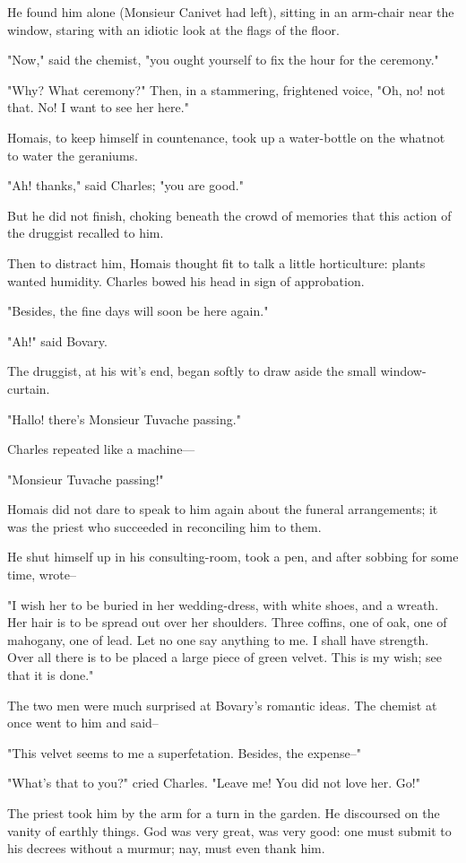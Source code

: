 \documentclass{tufte-book}
\begin{document}
He found him alone (Monsieur Canivet had left), sitting in an arm-chair
near the window, staring with an idiotic look at the flags of the floor.

"Now," said the chemist, "you ought yourself to fix the hour for the
ceremony."

"Why? What ceremony?" Then, in a stammering, frightened voice, "Oh, no!
not that. No! I want to see her here."

Homais, to keep himself in countenance, took up a water-bottle on the
whatnot to water the geraniums.

"Ah! thanks," said Charles; "you are good."

But he did not finish, choking beneath the crowd of memories that this
action of the druggist recalled to him.

Then to distract him, Homais thought fit to talk a little horticulture:
plants wanted humidity. Charles bowed his head in sign of approbation.

"Besides, the fine days will soon be here again."

"Ah!" said Bovary.

The druggist, at his wit's end, began softly to draw aside the small
window-curtain.

"Hallo! there's Monsieur Tuvache passing."

Charles repeated like a machine---

"Monsieur Tuvache passing!"

Homais did not dare to speak to him again about the funeral
arrangements; it was the priest who succeeded in reconciling him to
them.

He shut himself up in his consulting-room, took a pen, and after sobbing
for some time, wrote--

"I wish her to be buried in her wedding-dress, with white shoes, and a
wreath. Her hair is to be spread out over her shoulders. Three coffins,
one of oak, one of mahogany, one of lead. Let no one say anything to me.
I shall have strength. Over all there is to be placed a large piece of
green velvet. This is my wish; see that it is done."

The two men were much surprised at Bovary's romantic ideas. The chemist
at once went to him and said--

"This velvet seems to me a superfetation. Besides, the expense--"

"What's that to you?" cried Charles. "Leave me! You did not love her.
Go!"

The priest took him by the arm for a turn in the garden. He discoursed
on the vanity of earthly things. God was very great, was very good: one
must submit to his decrees without a murmur; nay, must even thank him.
\end{document}
